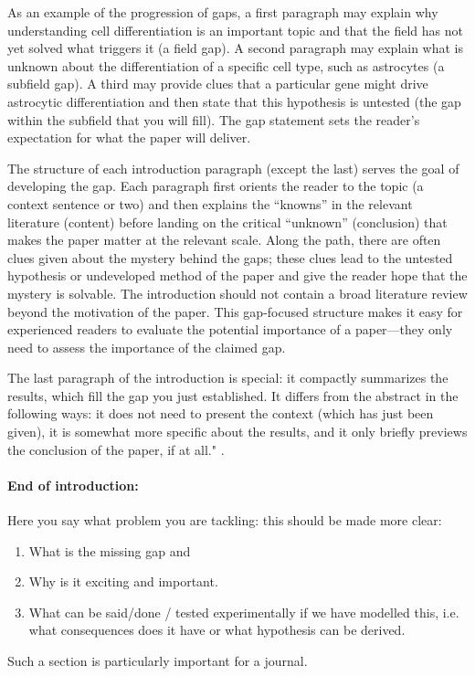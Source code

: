 As an example of the progression of gaps, a first paragraph may explain why understanding cell differentiation is an important topic and that the field has not yet solved what triggers it (a field gap). A second paragraph may explain what is unknown about the differentiation of a specific cell type, such as astrocytes (a subfield gap). A third may provide clues that a particular gene might drive astrocytic differentiation and then state that this hypothesis is untested (the gap within the subfield that you will fill). The gap statement sets the reader’s expectation for what the paper will deliver.

The structure of each introduction paragraph (except the last) serves the goal of developing the gap. Each paragraph first orients the reader to the topic (a context sentence or two) and then explains the “knowns” in the relevant literature (content) before landing on the critical “unknown” (conclusion) that makes the paper matter at the relevant scale. Along the path, there are often clues given about the mystery behind the gaps; these clues lead to the untested hypothesis or undeveloped method of the paper and give the reader hope that the mystery is solvable. The introduction should not contain a broad literature review beyond the motivation of the paper. This gap-focused structure makes it easy for experienced readers to evaluate the potential importance of a paper—they only need to assess the importance of the claimed gap.

The last paragraph of the introduction is special: it compactly summarizes the results, which fill the gap you just established. It differs from the abstract in the following ways: it does not need to present the context (which has just been given), it is somewhat more specific about the results, and it only briefly previews the conclusion of the paper, if at all." \cite{wilson2019ten}.



\paragraph{ End of introduction:}

 
 Here you say what problem you are tackling: this should be made more clear: 
 \begin{enumerate}
    \item What is the missing gap and 
    \item Why is it exciting and important.
    \item What can be said/done / tested experimentally if we have modelled this, i.e. what consequences does it have or what hypothesis can be derived.  
 \end{enumerate}
Such a section is particularly important for a journal.  

